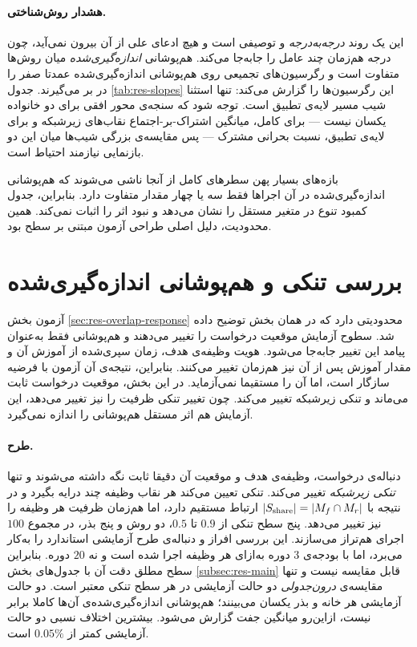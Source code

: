 \paragraph{هشدار روش‌شناختی.} این یک روند \emph{درجه‌به‌درجه} و توصیفی است و هیچ ادعای علی از آن بیرون نمی‌آید، چون درجه هم‌زمان چند عامل را جابه‌جا می‌کند. هم‌پوشانی \emph{اندازه‌گیری‌شده} میان روش‌ها متفاوت است و رگرسیون‌های تجمیعی روی هم‌پوشانی اندازه‌گیری‌شده عمدتا صفر را در بر می‌گیرند. جدول \ref{tab:res-slopes} این رگرسیون‌ها را گزارش می‌کند: تنها استثنا شیب  مسیر لایه‌ی تطبیق است. توجه شود که سنجه‌ی محور افقی برای دو خانواده یکسان نیست — برای  کامل، میانگین اشتراک-بر-اجتماع نقاب‌های زیرشبکه و برای لایه‌ی تطبیق، نسبت بحرانی مشترک — پس مقایسه‌ی بزرگی شیب‌ها میان این دو بازنمایی نیازمند احتیاط است.



بازه‌های بسیار پهن سطرهای  کامل از آنجا ناشی می‌شوند که هم‌پوشانی اندازه‌گیری‌شده در آن اجراها فقط سه یا چهار مقدار متفاوت دارد. بنابراین، جدول کمبود تنوع در متغیر مستقل را نشان می‌دهد و نبود اثر را اثبات نمی‌کند. همین محدودیت، دلیل اصلی طراحی آزمون مبتنی بر سطح بود.

\section{بررسی تنکی و هم‌پوشانی اندازه‌گیری‌شده}
\label{sec:res-overlap-direct}

آزمون بخش \ref{sec:res-overlap-response} محدودیتی دارد که در همان بخش توضیح داده شد. سطوح آزمایش موقعیت درخواست را تغییر می‌دهند و هم‌پوشانی فقط به‌عنوان پیامد این تغییر جابه‌جا می‌شود. هویت وظیفه‌ی هدف، زمان سپری‌شده از آموزش آن و مقدار آموزش پس از آن نیز هم‌زمان تغییر می‌کنند. بنابراین، نتیجه‌ی آن آزمون با فرضیه سازگار است، اما آن را مستقیما نمی‌آزماید. در این بخش، موقعیت درخواست ثابت می‌ماند و تنکی زیرشبکه تغییر می‌کند. چون تغییر تنکی ظرفیت را نیز تغییر می‌دهد، این آزمایش هم اثر مستقل هم‌پوشانی را اندازه نمی‌گیرد.

\paragraph{طرح.} دنباله‌ی درخواست، وظیفه‌ی هدف و موقعیت آن دقیقا ثابت نگه داشته می‌شوند و تنها \emph{تنکی زیرشبکه} تغییر می‌کند. تنکی تعیین می‌کند هر نقاب وظیفه چند درایه بگیرد و در نتیجه با $|S_{\mathrm{share}}|=|M_f\cap M_r|$ ارتباط مستقیم دارد، اما هم‌زمان ظرفیت هر وظیفه را نیز تغییر می‌دهد. پنج سطح تنکی از $0.9$ تا $0.5$، دو روش و پنج بذر، در مجموع $100$ اجرای هم‌تراز می‌سازند. این بررسی افراز و دنباله‌ی طرح آزمایشی استاندارد را به‌کار می‌برد، اما با بودجه‌ی $3$ دوره به‌ازای هر وظیفه اجرا شده است و نه $20$ دوره. بنابراین سطح مطلق دقت آن با جدول‌های بخش \ref{subsec:res-main} قابل مقایسه نیست و تنها مقایسه‌ی \emph{درون‌جدولی} دو حالت آزمایشی در هر سطح تنکی معتبر است. دو حالت آزمایشی هر خانه و بذر یکسان می‌بینند؛ هم‌پوشانی اندازه‌گیری‌شده‌ی آن‌ها کاملا برابر نیست، ازاین‌رو میانگین جفت گزارش می‌شود. بیشترین اختلاف نسبی دو حالت آزمایشی کمتر از $0.05\%$ است.

